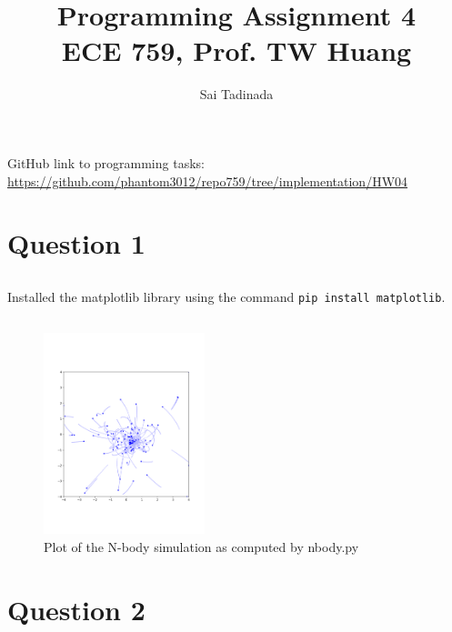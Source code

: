 \documentclass[12pt]{article}
\title{Programming Assignment 4 \\ \small{ECE 759, Prof. TW Huang}}
\author{Sai Tadinada}
\date{}
\begin{document}
\maketitle

GitHub link to programming tasks: \\ \url{https://github.com/phantom3012/repo759/tree/implementation/HW04}

\section{Question 1}
\subsection{}
Installed the matplotlib library using the command \texttt{pip install matplotlib}.
\subsection{}
\begin{figure}[ht]
    \centering
    \includegraphics[width=0.4175\textwidth]{task1.png}
    \caption{Plot of the N-body simulation as computed by nbody.py}
\end{figure}

\section{Question 2}
\end{document}

